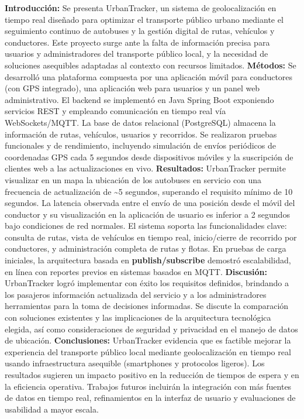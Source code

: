 \textbf{Introducción:} Se presenta UrbanTracker, un sistema de geolocalización en tiempo real diseñado para optimizar el transporte público urbano mediante el seguimiento continuo de autobuses y la gestión digital de rutas, vehículos y conductores. Este proyecto surge ante la falta de información precisa para usuarios y administradores del transporte público local, y la necesidad de soluciones asequibles adaptadas al contexto con recursos limitados. \textbf{Métodos:} Se desarrolló una plataforma compuesta por una aplicación móvil para conductores (con GPS integrado), una aplicación web para usuarios y un panel web administrativo. El backend se implementó en Java Spring Boot exponiendo servicios REST y empleando comunicación en tiempo real vía WebSockets/MQTT. La base de datos relacional (PostgreSQL) almacena la información de rutas, vehículos, usuarios y recorridos. Se realizaron pruebas funcionales y de rendimiento, incluyendo simulación de envíos periódicos de coordenadas GPS cada 5 segundos desde dispositivos móviles y la suscripción de clientes web a las actualizaciones en vivo. \textbf{Resultados:} UrbanTracker permite visualizar en un mapa la ubicación de los autobuses en servicio con una frecuencia de actualización de \textasciitilde5 segundos, superando el requisito mínimo de 10 segundos. La latencia observada entre el envío de una posición desde el móvil del conductor y su visualización en la aplicación de usuario es inferior a 2 segundos bajo condiciones de red normales. El sistema soporta las funcionalidades clave: consulta de rutas, vista de vehículos en tiempo real, inicio/cierre de recorrido por conductores, y administración completa de rutas y flotas. En pruebas de carga iniciales, la arquitectura basada en \textbf{publish/subscribe} demostró escalabilidad, en línea con reportes previos en sistemas basados en MQTT\cite{ortiz2022smolcomm}. \textbf{Discusión:} UrbanTracker logró implementar con éxito los requisitos definidos, brindando a los pasajeros información actualizada del servicio y a los administradores herramientas para la toma de decisiones informadas. Se discute la comparación con soluciones existentes y las implicaciones de la arquitectura tecnológica elegida, así como consideraciones de seguridad y privacidad en el manejo de datos de ubicación. \textbf{Conclusiones:} UrbanTracker evidencia que es factible mejorar la experiencia del transporte público local mediante geolocalización en tiempo real usando infraestructura asequible (smartphones y protocolos ligeros). Los resultados sugieren un impacto positivo en la reducción de tiempos de espera y en la eficiencia operativa. Trabajos futuros incluirán la integración con más fuentes de datos en tiempo real, refinamientos en la interfaz de usuario y evaluaciones de usabilidad a mayor escala.
